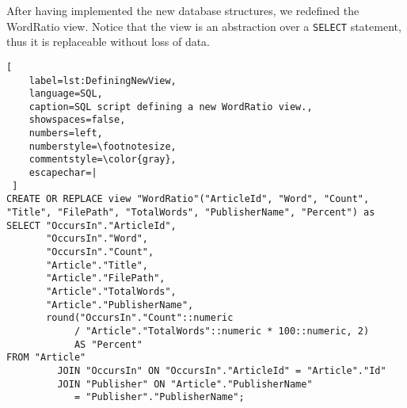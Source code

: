 After having implemented the new database structures, we redefined the WordRatio view.
Notice that the view is an abstraction over a \texttt{SELECT} statement, thus it is replaceable without loss of data.


\begin{lstlisting}[
    label=lst:DefiningNewView,
    language=SQL,
    caption=SQL script defining a new WordRatio view.,
    showspaces=false,
    numbers=left,
    numberstyle=\footnotesize,
    commentstyle=\color{gray},
    escapechar=|
 ]
CREATE OR REPLACE view "WordRatio"("ArticleId", "Word", "Count", "Title", "FilePath", "TotalWords", "PublisherName", "Percent") as
SELECT "OccursIn"."ArticleId",
       "OccursIn"."Word",
       "OccursIn"."Count",
       "Article"."Title",
       "Article"."FilePath",
       "Article"."TotalWords",
       "Article"."PublisherName",
       round("OccursIn"."Count"::numeric 
            / "Article"."TotalWords"::numeric * 100::numeric, 2) 
            AS "Percent"
FROM "Article"
         JOIN "OccursIn" ON "OccursIn"."ArticleId" = "Article"."Id"
         JOIN "Publisher" ON "Article"."PublisherName" 
            = "Publisher"."PublisherName";
\end{lstlisting}
